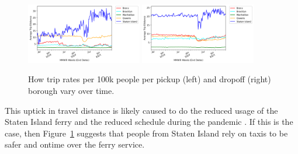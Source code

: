 \documentclass[11pt]{article}
\begin{document}
\begin{figure}[h]
    \includegraphics[width=0.45\textwidth]{../plots/time-series-Average Trip Distance-vs-MMWR Weeks (End Dates)-by-pu_borough.png}
    \includegraphics[width=0.45\textwidth]{../plots/time-series-Average Trip Distance-vs-MMWR Weeks (End Dates)-by-do_borough.png}
    \centering
    \caption{How trip rates per 100k people per pickup (left) and dropoff (right) borough vary over time.} %
    \label{fig:ts-dist-weeks}
\end{figure}

This uptick in travel distance is likely caused to do the reduced usage of the Staten Island ferry and the reduced schedule during the pandemic \cite{dot2020}.
If this is the case, then Figure~\ref{fig:ts-dist-weeks} suggests that people from Staten Island rely on taxis to be safer and ontime over the ferry service.


\end{document}
